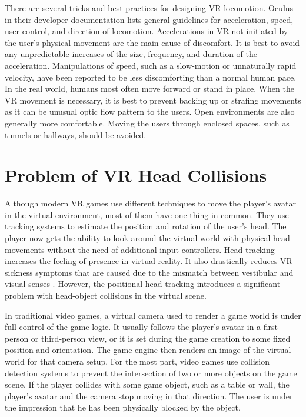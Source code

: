 There are several tricks and best practices for designing VR locomotion. Oculus in their developer documentation \cite{OCULUSDOC} lists general guidelines for acceleration, speed, user control, and direction of locomotion. Accelerations in VR not initiated by the user's physical movement are the main cause of discomfort. It is best to avoid any unpredictable increases of the size, frequency, and duration of the acceleration. Manipulations of speed, such as a slow-motion or unnaturally rapid velocity, have been reported to be less discomforting than a normal human pace. In the real world, humans most often move forward or stand in place. When the VR movement is necessary, it is best to prevent backing up or strafing movements as it can be unusual optic flow pattern to the users. Open environments are also generally more comfortable. Moving the users through enclosed spaces, such as tunnels or hallways, should be avoided.

\section{Problem of VR Head Collisions}

Although modern VR games use different techniques to move the player's avatar in the virtual environment, most of them have one thing in common. They use tracking systems to estimate the position and rotation of the user's head. The player now gets the ability to look around the virtual world with physical head movements without the need of additional input controllers. Head tracking increases the feeling of presence in virtual reality. It also drastically reduces VR sickness symptoms that are caused due to the mismatch between vestibular and visual senses \cite{HEADTRACKINGSYMPTOMS}. However, the positional head tracking introduces a significant problem with head-object collisions in the virtual scene.

In traditional video games, a virtual camera used to render a game world is under full control of the game logic. It usually follows the player's avatar in a first-person or third-person view, or it is set during the game creation to some fixed position and orientation. The game engine then renders an image of the virtual world for that camera setup. For the most part, video games use collision detection systems to prevent the intersection of two or more objects on the game scene. If the player collides with some game object, such as a table or wall, the player's avatar and the camera stop moving in that direction. The user is under the impression that he has been physically blocked by the object. 

